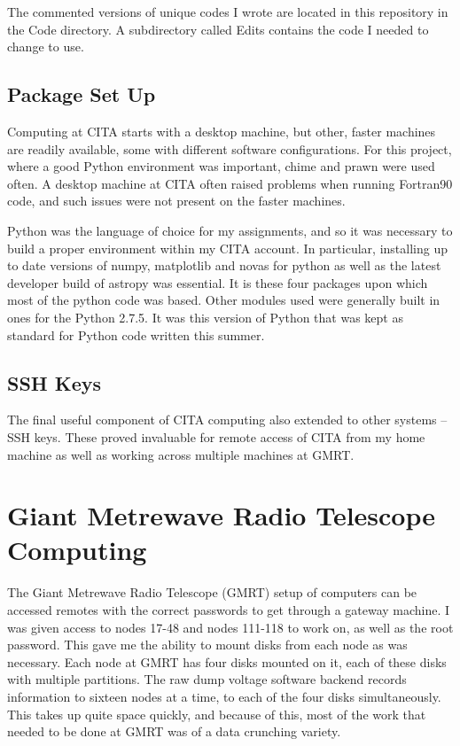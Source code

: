 \documentclass[a4paper,12pt]{article}
\begin{document}
The commented versions of unique codes I wrote are located in this repository in the Code directory. A subdirectory called Edits contains the code I needed to change to use.

\subsection{Package Set Up}
\label{sec:packagesetup}

Computing at CITA starts with a desktop machine, but other, faster machines are readily available, some with different software configurations. For this project, where a good Python environment was important, chime and prawn were used often. A desktop machine at CITA often raised problems when running Fortran90 code, and such issues were not present on the faster machines.

Python was the language of choice for my assignments, and so it was necessary to build a proper environment within my CITA account. In particular, installing up to date versions of numpy, matplotlib and novas for python as well as the latest developer build of astropy was essential. It is these four packages upon which most of the python code was based. Other modules used were generally built in ones for the Python 2.7.5. It was this version of Python that was kept as standard for Python code written this summer.

\subsection{SSH Keys}
\label{sec:sshkeys}

The final useful component of CITA computing also extended to other systems – SSH keys. These proved invaluable for remote access of CITA from my home machine as well as working across multiple machines at GMRT.

\section{Giant Metrewave Radio Telescope Computing}
\label{sec:gmrtcomputing}

The Giant Metrewave Radio Telescope (GMRT) setup of computers can be accessed remotes with the correct passwords to get through a gateway machine. I was given access to nodes 17-48 and nodes 111-118 to work on, as well as the root password. This gave me the ability to mount disks from each node as was necessary. Each node at GMRT has four disks mounted on it, each of these disks with multiple partitions. The raw dump voltage software backend records information to sixteen nodes at a time, to each of the four disks simultaneously. This takes up quite space quickly, and because of this, most of the work that needed to be done at GMRT was of a data crunching variety.
\end{document}
